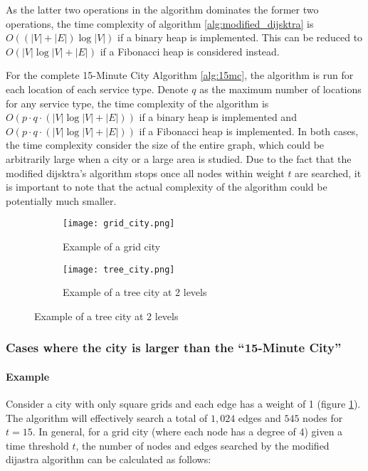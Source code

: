 As the latter two operations in the algorithm dominates the former two operations, the time complexity of algorithm \ref{alg:modified_dijsktra} is $O((|V|+|E|)\log |V|)$ if a binary heap is implemented. This can be reduced to $O(|V|\log |V|+|E|)$ if a Fibonacci heap is considered instead.

For the complete 15-Minute City Algorithm \ref{alg:15mc}, the algorithm is run for each location of each service type. Denote $q$ as the maximum number of locations for any service type, the time complexity of the algorithm is $O(p\cdot q\cdot(|V|\log |V|+|E|))$ if a binary heap is implemented and $O(p\cdot q\cdot(|V|\log |V|+|E|))$ if a Fibonacci heap is implemented. In both cases, the time complexity consider the size of the entire graph, which could be arbitrarily large when a city or a large area is studied. Due to the fact that the modified dijsktra's algorithm stops once all nodes within weight $t$ are searched, it is important to note that the actual complexity of the algorithm could be potentially much smaller.

\begin{figure}[H]
    \centering
    \begin{subfigure}{0.5\textwidth}
        \centering
        \texttt{[image: grid\_city.png]}
        \caption{Example of a grid city}
        \label{fig:grid_city}
    \end{subfigure}\hfill
    \begin{subfigure}{0.5\textwidth}
        \centering
        \texttt{[image: tree\_city.png]}
        \caption{Example of a tree city at 2 levels}
        \label{fig:tree_city}
    \end{subfigure}
\end{figure}

\subsubsection{Cases where the city is larger than the ``15-Minute City''}

\paragraph{Example}

Consider a city with only square grids and each edge has a weight of 1 (figure \ref{fig:grid_city}). The algorithm will effectively search a total of $1,024$ edges and $545$ nodes for $t=15$. In general, for a grid city (where each node has a degree of 4) given a time threshold $t$, the number of nodes and edges searched by the modified dijastra algorithm can be calculated as follows:

